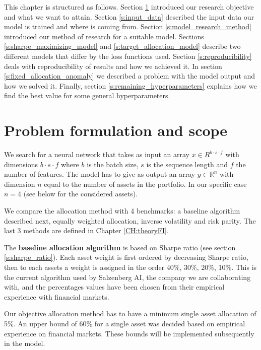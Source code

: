 This chapter is structured as follows. Section \ref{s:research_objective} introduced our research objective and what we want to attain. Section \ref{s:input_data} described the input data our model is trained and where is coming from. Section \ref{s:model_research_method} introduced our method of research for a suitable model. Sections \ref{s:sharpe_maximizing_model} and \ref{s:target_allocation_model} describe two different models that differ by the loss functions used. Section \ref{s:reproducibility} deals with reproducibility of results and how we achieved it. In section \ref{s:fixed_allocation_anomaly} we described a problem with the model output and how we solved it. Finally, section \ref{s:remaining_hyperparameters} explains how we find the best value for some general hyperparameters.

\section{Problem formulation and scope}
\label{s:research_objective}

We search for a neural network that takes as input an array $x \in R^{b \cdot s \cdot f}$ with dimensions $b \cdot s \cdot f$ where $b$ is the batch size, $s$ is the sequence length and $f$ the number of features. 
The model has to give as output an array $y \in \mathbb{R}^n$ with dimension $n$ equal to the number of assets in the portfolio. In our specific case $n=4$ (see below for the considered assets). 

\hfill \break

We compare the allocation method with 4 benchmarks: a baseline algorithm described next, equally weighted allocation, inverse volatility and risk parity. The last 3 methods are defined in Chapter \ref{CH:theoryFI}.


The \textbf{baseline allocation algorithm} is based on Sharpe ratio (see section \ref{s:sharpe_ratio}). Each asset weight is first ordered by decreasing Sharpe ratio, then to each assets a weight is assigned in the order 40\%, 30\%, 20\%, 10\%. This is the current algorithm used by Salzenberg AI, the company we are collaborating with, and the percentages values have been chosen from their empirical experience with financial markets.

\hfill \break

Our objective allocation method has to have a minimum single asset allocation of 5\%. An upper bound of 60\% for a single asset was decided based on empirical experience on financial markets. These bounds will be implemented subsequently in the model.

